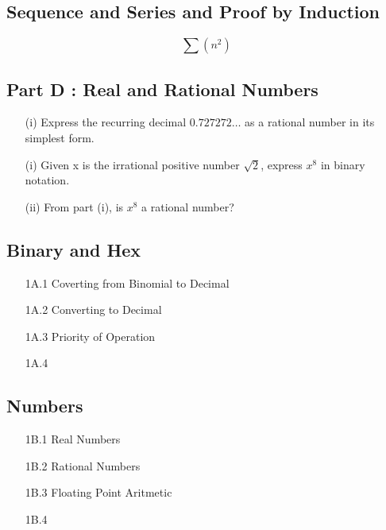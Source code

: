 \documentclass[]{report}
\begin{document}
\begin{enumerate}
\section{Sequence and Series and Proof by Induction}


\[\sum (n^2) \]



\subsection*{Part D : Real and Rational Numbers}
\begin{itemize}
\item[(i)] Express the recurring decimal $0.727272\ldots$ as a rational number in its simplest form.
\end{itemize}
\begin{itemize}
\item[(i)] Given x is the irrational positive number $\sqrt{2}$, express $x^8$ in binary notation.
\item[(ii)] From part (i), is $x^8$ a rational number?
\end{itemize}

\subsection*{Binary and Hex}
\begin{itemize}
\item[1A.1] Coverting from Binomial to Decimal
\item[1A.2] Converting to Decimal
\item[1A.3] Priority of Operation
\item[1A.4] 
\end{itemize}

\subsection*{Numbers}
\begin{itemize}
\item[1B.1] Real Numbers
\item[1B.2] Rational Numbers
\item[1B.3] Floating Point Aritmetic
\item[1B.4] 
\end{itemize}


\end{enumerate}
\end{document}
